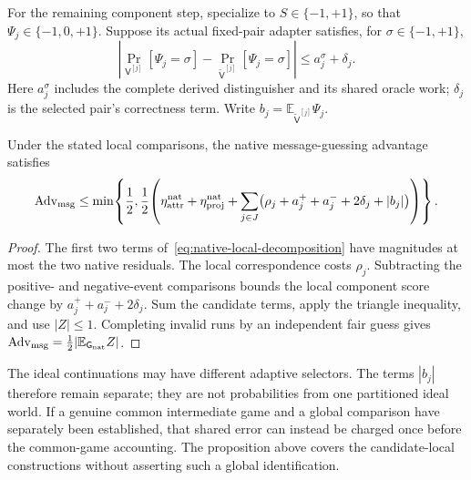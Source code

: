 For the remaining component step, specialize to $S\in\{-1,+1\}$, so that
$\Psi_j\in\{-1,0,+1\}$.  Suppose its actual fixed-pair adapter satisfies,
for $\sigma\in\{-1,+1\}$,
\[
 \left|\Pr_{\mathsf V^{[j]}}[\Psi_j=\sigma]
       -\Pr_{\widetilde{\mathsf V}^{[j]}}[\Psi_j=\sigma]\right|
 \le a_j^\sigma+\delta_j.
\]
Here $a_j^\sigma$ includes the complete derived distinguisher and its shared
oracle work; $\delta_j$ is the selected pair's correctness term.  Write
$b_j=\mathbb E_{\widetilde{\mathsf V}^{[j]}}\Psi_j$.

\begin{proposition}
\label{prop:native-local-accounting}
Under the stated local comparisons, the native message-guessing advantage
satisfies
\[
 \operatorname{Adv}_{\rm msg}
 \le\min\!\left\{\frac12,\frac12\!\left(
 \eta_{\rm attr}^{\rm nat}+\eta_{\rm proj}^{\rm nat}
 +\sum_{j\in J}
    \bigl(\rho_j+a_j^++a_j^-+2\delta_j+|b_j|\bigr)
 \right)\right\}.
\]
\end{proposition}
\begin{proof}
The first two terms of~\eqref{eq:native-local-decomposition} have magnitudes
at most the two native residuals.  The local correspondence costs $\rho_j$.
Subtracting the positive- and negative-event comparisons bounds the local
component score change by $a_j^++a_j^-+2\delta_j$.  Sum the candidate terms,
apply the triangle inequality, and use $|Z|\le1$.  Completing invalid runs
by an independent fair guess gives
$\operatorname{Adv}_{\rm msg}=\tfrac12|\mathbb E_{\mathsf G_{\rm nat}}Z|$.
\end{proof}

The ideal continuations may have different adaptive selectors.  The terms
$|b_j|$ therefore remain separate; they are not probabilities from one
partitioned ideal world.  If a genuine common intermediate game and a global
comparison have separately been established, that shared error can instead be
charged once before the common-game accounting.  The proposition above
covers the candidate-local constructions without asserting such a global
identification.
